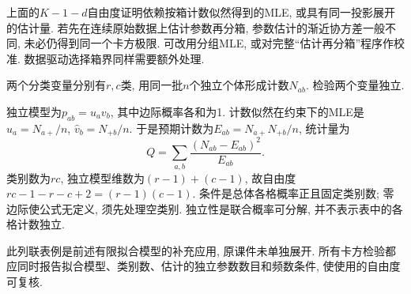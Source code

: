 \begin{remark}[分组估计的条件]
上面的$K-1-d$自由度证明依赖按箱计数似然得到的MLE, 或具有同一投影展开的估计量. 若先在连续原始数据上估计参数再分箱, 参数估计的渐近协方差一般不同, 未必仍得到同一个卡方极限. 可改用分组MLE, 或对完整``估计再分箱''程序作校准. 数据驱动选择箱界同样需要额外处理.
\end{remark}
\begin{example}
两个分类变量分别有$r,c$类, 用同一批$n$个独立个体形成计数$N_{ab}$. 检验两个变量独立.
\end{example}
\begin{solution}
独立模型为$p_{ab}=u_av_b$, 其中边际概率各和为1. 计数似然在约束下的MLE是$\hat u_a=N_{a+}/n$, $\hat v_b=N_{+b}/n$. 于是预期计数为$E_{ab}=N_{a+}N_{+b}/n$, 统计量为
\[
 Q=\sum_{a,b}\frac{(N_{ab}-E_{ab})^2}{E_{ab}}.
\]
类别数为$rc$, 独立模型维数为$(r-1)+(c-1)$, 故自由度$rc-1-r-c+2=(r-1)(c-1)$. 条件是总体各格概率正且固定类别数; 零边际使公式无定义, 须先处理空类别. 独立性是联合概率可分解, 并不表示表中的各格计数独立.
\end{solution}
此列联表例是前述有限拟合模型的补充应用, 原课件未单独展开. 所有卡方检验都应同时报告拟合模型、类别数、估计的独立参数数目和频数条件, 使使用的自由度可复核.
